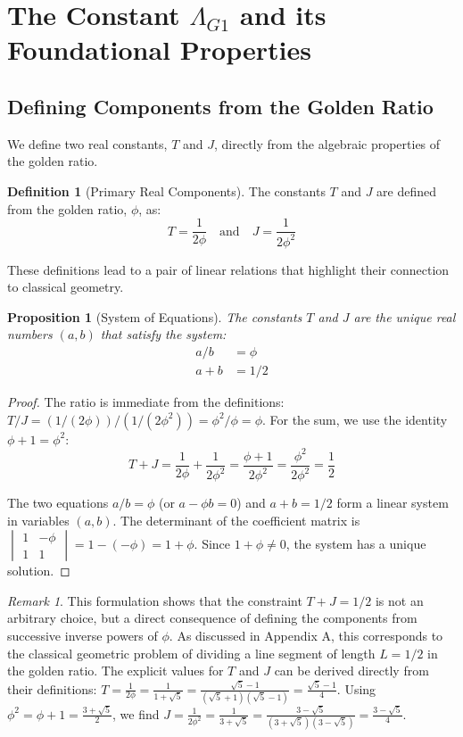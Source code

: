 \documentclass{amsart}
\theoremstyle{plain}
\newtheorem{proposition}[theorem]{Proposition}
\theoremstyle{definition}
\newtheorem{definition}[theorem]{Definition}
\theoremstyle{remark}
\newtheorem*{remark}{Remark}
\newcommand{\LambdaG}{\Lambda_{G1}}
\newcommand{\phiG}{\phi}
\begin{document}
\section{The Constant \texorpdfstring{$\LambdaG$}{Lambda\_G1} and its Foundational Properties}

\subsection{Defining Components from the Golden Ratio}
We define two real constants, $T$ and $J$, directly from the algebraic properties of the golden ratio.
\begin{definition}[Primary Real Components]
The constants $T$ and $J$ are defined from the golden ratio, $\phiG$, as:
$$ T = \frac{1}{2\phiG} \quad \text{and} \quad J = \frac{1}{2\phiG^2} $$

\end{definition}

These definitions lead to a pair of linear relations that highlight their connection to classical geometry.
\begin{proposition}[System of Equations]
The constants $T$ and $J$ are the unique real numbers $(a,b)$ that satisfy the system:
\begin{align}
    a/b &= \phiG \\
    a+b &= 1/2
\end{align}

\end{proposition}
\begin{proof}
The ratio is immediate from the definitions: $T/J = (1/(2\phiG))/(1/(2\phiG^2)) = \phiG^2/\phiG = \phiG$. For the sum, we use the identity $\phiG+1 = \phiG^2$:
$$ T+J = \frac{1}{2\phiG} + \frac{1}{2\phiG^2} = \frac{\phiG+1}{2\phiG^2} = \frac{\phiG^2}{2\phiG^2} = \frac{1}{2} $$

The two equations $a/b = \phiG$ (or $a - \phiG b = 0$) and $a+b=1/2$ form a linear system in variables $(a,b)$. The determinant of the coefficient matrix is $\begin{vmatrix} 1 & -\phiG \\ 1 & 1 \end{vmatrix} = 1 - (-\phiG) = 1+\phiG$. Since $1+\phiG \neq 0$, the system has a unique solution.
\end{proof}

\begin{remark}
This formulation shows that the constraint $T+J=1/2$ is not an arbitrary choice, but a direct consequence of defining the components from successive inverse powers of $\phiG$. As discussed in Appendix A, this corresponds to the classical geometric problem of dividing a line segment of length $L=1/2$ in the golden ratio. The explicit values for $T$ and $J$ can be derived directly from their definitions:
$T = \frac{1}{2\phiG} = \frac{1}{1+\sqrt{5}} = \frac{\sqrt{5}-1}{(\sqrt{5}+1)(\sqrt{5}-1)} = \frac{\sqrt{5}-1}{4}$.
Using $\phiG^2 = \phiG+1 = \frac{3+\sqrt{5}}{2}$, we find $J = \frac{1}{2\phiG^2} = \frac{1}{3+\sqrt{5}} = \frac{3-\sqrt{5}}{(3+\sqrt{5})(3-\sqrt{5})} = \frac{3-\sqrt{5}}{4}$.
\end{remark}
\end{document}

